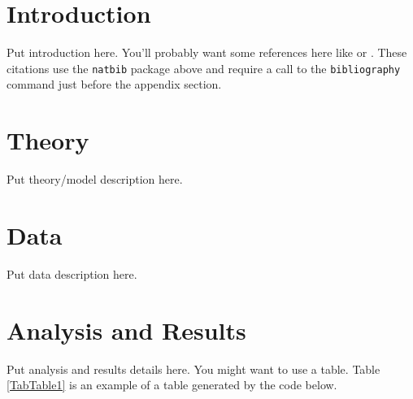 \documentclass[letterpaper,12pt]{article}
\theoremstyle{definition}
\begin{document}
\begin{spacing}{1.5}{}

\section{Introduction}\label{SecIntro}

  Put introduction here. You'll probably want some references here like \citet{Auerbach:1996} or \citet{DEPR2015}. These citations use the \texttt{natbib} package above and require a call to the \texttt{bibliography} command just before the appendix section.


\section{Theory}\label{SecTheory}

  Put theory/model description here.


\section{Data}\label{SecData}

  Put data description here.


\section{Analysis and Results}\label{SecResults}

  Put analysis and results details here. You might want to use a table. Table \ref{TabTable1} is an example of a table generated by the code below.


\end{spacing}
\end{document}
